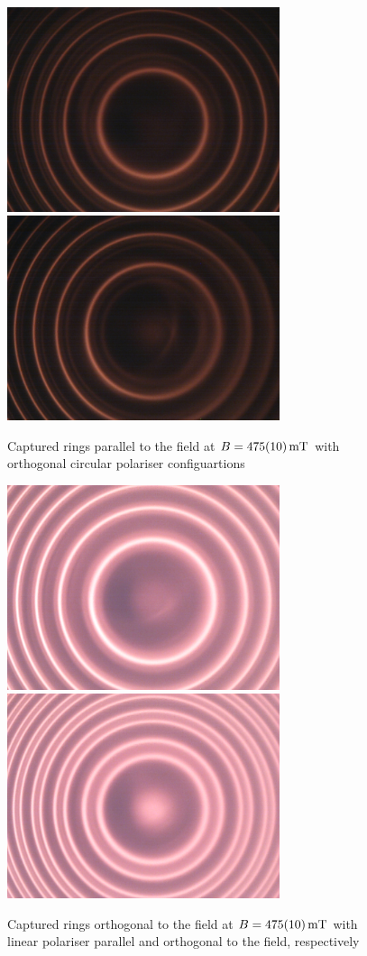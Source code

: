 \documentclass[a4paper]{scrartcl}
\begin{document}
\begin{figure}
    \centering
    \includegraphics[width = 8cm]{data/475+-10mT-parr-north-away-circular-polariser.png}
    \includegraphics[width = 8cm]{data/475+-10mT-parr-north-towards-circular-polariser.png}
    \caption{Captured rings parallel to the field at \(B = \SI{475 \pm 10}{\milli\tesla}\) with orthogonal circular polariser configuartions}
    \label{fig:circular-polariser}
\end{figure}
\begin{figure}
    \centering
    \includegraphics[width = 8cm]{data/475+-10mT-orth-linear-polariser-parallel.png}
    \includegraphics[width = 8cm]{data/475+-10mT-orth-linear-polariser-orth.png}
    \caption{Captured rings orthogonal to the field at \(B = \SI{475 \pm 10}{\milli\tesla}\) with linear polariser parallel and orthogonal to the field, respectively}
    \label{fig:linear-polariser}
\end{figure}
\end{document}
